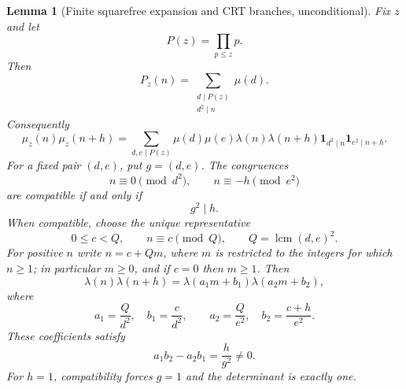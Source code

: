 \documentclass[11pt]{amsart}
\numberwithin{equation}{section}
\theoremstyle{plain}
\newtheorem{lemma}[theorem]{Lemma}
\theoremstyle{definition}
\theoremstyle{remark}
\newcommand{\one}{\mathbf 1}
\newcommand{\mob}{\mu}
\newcommand{\liou}{\lambda}
\DeclareMathOperator{\lcm}{lcm}
\begin{document}
\begin{lemma}[Finite squarefree expansion and CRT branches, unconditional]
\label{lem:finite_squarefree_CRT}
Fix $z$ and let
\begin{equation}
P(z)=\prod_{p\le z}p.
\label{eq:primorial_z}
\end{equation}
Then
\begin{equation}
P_z(n)=\sum_{\substack{d\mid P(z)\\d^2\mid n}}\mob(d).
\label{eq:Pz_inclusion_exclusion}
\end{equation}
Consequently
\begin{equation}
\mob_z(n)\mob_z(n+h)
=
\sum_{d,e\mid P(z)}
\mob(d)\mob(e)\liou(n)\liou(n+h)
\one_{d^2\mid n}\one_{e^2\mid n+h}.
\label{eq:mu_z_product_expansion}
\end{equation}
For a fixed pair $(d,e)$, put $g=(d,e)$.  The congruences
\begin{equation}
n\equiv0\pmod{d^2},
\qquad
n\equiv-h\pmod{e^2}
\label{eq:de_congruences}
\end{equation}
are compatible if and only if
\begin{equation}
g^2\mid h.
\label{eq:de_compatibility}
\end{equation}
When compatible, choose the unique representative
\begin{equation}
0\le c<Q,
\qquad
n\equiv c\pmod Q,
\qquad
Q=\lcm(d,e)^2.
\label{eq:de_CRT_class}
\end{equation}
For positive $n$ write $n=c+Qm$, where $m$ is restricted to the integers for which $n\ge1$; in particular $m\ge0$, and if $c=0$ then $m\ge1$.  Then
\begin{equation}
\liou(n)\liou(n+h)
=\liou(a_1m+b_1)\liou(a_2m+b_2),
\label{eq:de_liouville_forms}
\end{equation}
where
\begin{equation}
a_1=\frac Q{d^2},\quad b_1=\frac c{d^2},
\qquad
a_2=\frac Q{e^2},\quad b_2=\frac{c+h}{e^2}.
\label{eq:de_affine_coefficients}
\end{equation}
These coefficients satisfy
\begin{equation}
a_1b_2-a_2b_1=\frac{h}{g^2}\ne0.
\label{eq:de_determinant}
\end{equation}
For $h=1$, compatibility forces $g=1$ and the determinant is exactly one.
\end{lemma}
\end{document}

